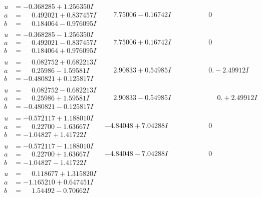 \documentclass[1p]{elsarticle_modified}
\theoremstyle{definition}
\begin{document}
$$\begin{array}{c|c|c}
\begin{aligned}
u &= -0.368285 + 1.256350 I \\
a &= \phantom{-}0.492021 + 0.837457 I \\
b &= \phantom{-}0.184064 - 0.976095 I\end{aligned}
 & \phantom{-}7.75006 - 0.16742 I & \phantom{-0.000000 } 0 \\ \hline\begin{aligned}
u &= -0.368285 - 1.256350 I \\
a &= \phantom{-}0.492021 - 0.837457 I \\
b &= \phantom{-}0.184064 + 0.976095 I\end{aligned}
 & \phantom{-}7.75006 + 0.16742 I & \phantom{-0.000000 } 0 \\ \hline\begin{aligned}
u &= \phantom{-}0.082752 + 0.682213 I \\
a &= \phantom{-}0.25986 - 1.59581 I \\
b &= -0.480821 + 0.125817 I\end{aligned}
 & \phantom{-}2.90833 + 0.54985 I & \phantom{-0.000000 } 0. - 2.49912 I \\ \hline\begin{aligned}
u &= \phantom{-}0.082752 - 0.682213 I \\
a &= \phantom{-}0.25986 + 1.59581 I \\
b &= -0.480821 - 0.125817 I\end{aligned}
 & \phantom{-}2.90833 - 0.54985 I & \phantom{-0.000000 -}0. + 2.49912 I \\ \hline\begin{aligned}
u &= -0.572117 + 1.188010 I \\
a &= \phantom{-}0.22700 - 1.63667 I \\
b &= -1.04827 + 1.41722 I\end{aligned}
 & -4.84048 + 7.04288 I & \phantom{-0.000000 } 0 \\ \hline\begin{aligned}
u &= -0.572117 - 1.188010 I \\
a &= \phantom{-}0.22700 + 1.63667 I \\
b &= -1.04827 - 1.41722 I\end{aligned}
 & -4.84048 - 7.04288 I & \phantom{-0.000000 } 0 \\ \hline\begin{aligned}
u &= \phantom{-}0.118677 + 1.315820 I \\
a &= -1.165210 + 0.647451 I \\
b &= \phantom{-}1.54492 - 0.70662 I\end{aligned}

\end{array}$$
\end{document}
